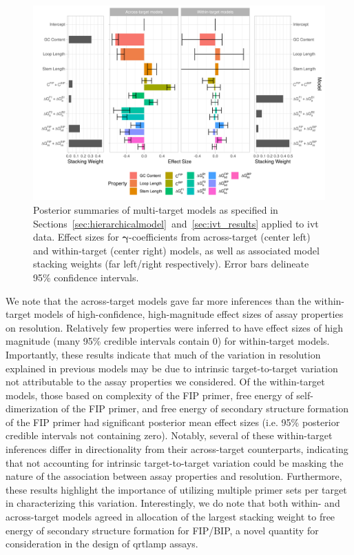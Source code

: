\documentclass[../thesis.tex]{subfiles}
\begin{document}
\begin{figure}[!tpb] 
\centering
\includegraphics[width=6in]{../figures/chapter2/paper_ivt_eval_fig.png}
\caption{Posterior summaries of multi-target models as specified in Sections~\ref{sec:hierarchicalmodel}~and~\ref{sec:ivt_results} applied to \gls{ivt}  data. Effect sizes for $\bm{\gamma}$-coefficients from across-target (center left) and within-target (center right) models, as well as associated model stacking weights (far left/right respectively). Error bars delineate 95\% confidence intervals. \label{fig:ivt_eval}}
\end{figure}

We note that the across-target models gave far more inferences than the within-target models of high-confidence, high-magnitude effect sizes of assay properties on resolution. Relatively few properties were inferred to have effect sizes of high magnitude (many 95\% credible intervals contain 0) for within-target models. Importantly, these results indicate that much of the variation in resolution explained in previous models may be due to intrinsic target-to-target variation not attributable to the assay properties we considered. Of the within-target models, those based on complexity of the FIP primer, free energy of self-dimerization of the FIP primer, and free energy of secondary structure formation of the FIP primer had significant posterior mean effect sizes (i.e. 95\% posterior credible intervals not containing zero). Notably, several of these within-target inferences differ in directionality from their across-target counterparts, indicating that not accounting for intrinsic target-to-target variation could be masking the nature of the association between assay properties and resolution. Furthermore, these results highlight the importance of utilizing multiple primer sets per target in characterizing this variation. Interestingly, we do note that both within- and across-target models agreed in allocation of the largest stacking weight to free energy of secondary structure formation for FIP/BIP, a novel quantity for consideration in the design of \gls{qrtlamp} assays.
\end{document}
